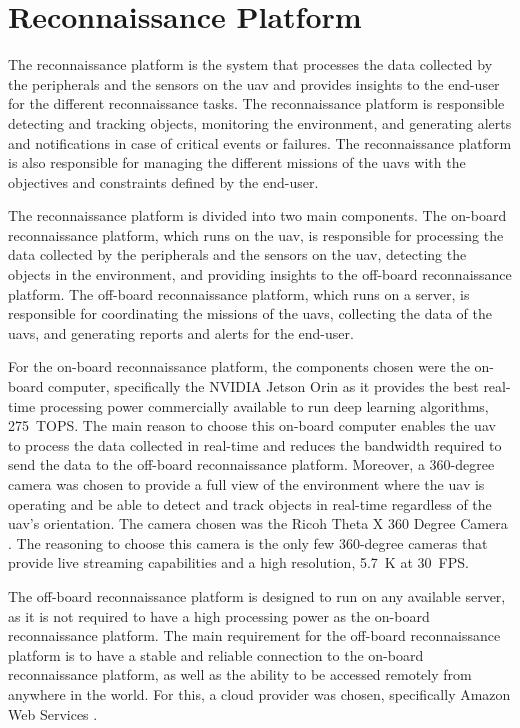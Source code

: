 \section{Reconnaissance Platform}\label{sec:design_reconnaissance_platform}

The reconnaissance platform is the system that processes the data collected by the peripherals and the sensors on the \gls{uav} and provides insights to the end-user for the different reconnaissance tasks. The reconnaissance platform is responsible detecting and tracking objects, monitoring the environment, and generating alerts and notifications in case of critical events or failures. The reconnaissance platform is also responsible for managing the different missions of the \glspl{uav} with the objectives and constraints defined by the end-user.

The reconnaissance platform is divided into two main components. The on-board reconnaissance platform, which runs on the \gls{uav}, is responsible for processing the data collected by the peripherals and the sensors on the \gls{uav}, detecting the objects in the environment, and providing insights to the off-board reconnaissance platform. The off-board reconnaissance platform, which runs on a server, is responsible for coordinating the missions of the \glspl{uav}, collecting the data of the \glspl{uav}, and generating reports and alerts for the end-user.

For the on-board reconnaissance platform, the components chosen were the on-board computer, specifically the NVIDIA Jetson Orin \autocite{nvidiaNVIDIAJetson} as it provides the best real-time processing power commercially available to run deep learning algorithms, \SI{275}{TOPS}. The main reason to choose this on-board computer enables the \gls{uav} to process the data collected in real-time and reduces the bandwidth required to send the data to the off-board reconnaissance platform. Moreover, a 360-degree camera was chosen to provide a full view of the environment where the \gls{uav} is operating and be able to detect and track objects in real-time regardless of the \gls{uav}'s orientation. The camera chosen was the Ricoh Theta X 360 Degree Camera \autocite{ricohimagingTHETARicoh}. The reasoning to choose this camera is the only few 360-degree cameras that provide live streaming capabilities and a high resolution, \SI{5.7}{K} at \SI{30}{FPS}.

The off-board reconnaissance platform is designed to run on any available server, as it is not required to have a high processing power as the on-board reconnaissance platform. The main requirement for the off-board reconnaissance platform is to have a stable and reliable connection to the on-board reconnaissance platform, as well as the ability to be accessed remotely from anywhere in the world. For this, a cloud provider was chosen, specifically Amazon Web Services \autocite{amazonCloudComputing}.

